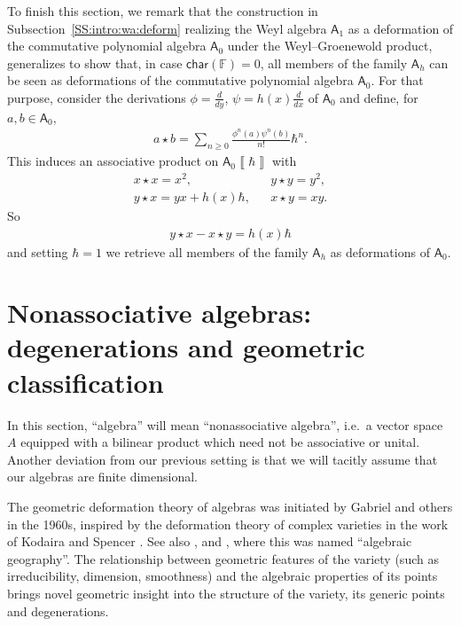 \documentclass{commat}
\newcommand{\FF}{\mathbb{F}}
\newcommand{\A}{\mathsf{A}}
\newcommand\chara{\mathsf {char}}
\newcommand{\formal}[1]{\left\llbracket #1\right\rrbracket}
\begin{document}
To finish this section, we remark that the construction in Subsection~\ref{SS:intro:wa:deform} realizing  the Weyl algebra $\A_1$ as a deformation of the commutative polynomial algebra $\A_0$ under the Weyl--Groenewold product, generalizes to show that, in case $\chara(\FF)=0$, all members of the family $\A_h$ can be seen as deformations of the commutative polynomial algebra $\A_0$. For that purpose, consider the derivations $\phi=\frac{d}{dy}$, $\psi=h(x)\frac{d}{dx}$ of $\A_0$ and define, for $a, b\in\A_0$,
\begin{align*}
	a\star b=\sum_{n\geq 0} \frac{\phi^n(a)\psi^n(b)}{n!}\hbar^n.
\end{align*}
This induces an associative product on $\A_0\formal{\hbar}$ with
\begin{eqnarray*}
	x\star x =x^2, && y\star y=y^2,\\
	y\star x=yx+h(x)\hbar, && x\star y=xy.
\end{eqnarray*}
So 
\begin{align*}
	y\star x-x\star y=h(x)\hbar
\end{align*}
and setting $\hbar=1$ we retrieve all members of the family $\A_h$ as deformations of $\A_0$.


\section{Nonassociative algebras: degenerations and geometric classification}\label{S:naa}

In this section, ``algebra'' will mean ``nonassociative algebra'', i.e.\ a vector space $A$ equipped with a bilinear product which need not be associative or unital. Another deviation from our previous setting is that we will tacitly assume that our algebras are finite dimensional.


The geometric deformation theory of algebras was initiated by Gabriel and others in the 1960s, inspired by the deformation theory of complex varieties in the work of Kodaira and Spencer \cite{KS58}. See also \cite{mG64}, \cite{NR66} and \cite{fF68}, where this was named ``algebraic geography''. The relationship between geometric features of the variety (such as irreducibility, dimension, smoothness) and the algebraic properties of its points brings novel geometric insight into the structure of the variety, its generic points and degenerations. 
\end{document}
